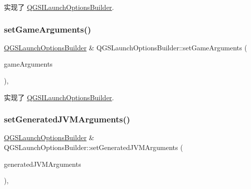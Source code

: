 实现了 \mbox{\hyperlink{class_q_g_s_i_launch_options_builder_ab3669bbcb9fc5602356cc05bc030b306}{Q\+G\+S\+I\+Launch\+Options\+Builder}}.

\mbox{\label{class_q_g_s_launch_options_builder_a6e6403b36902ac004af9ed2e9a9726c6}} 
\subsubsection{\texorpdfstring{set\+Game\+Arguments()}{setGameArguments()}}
{\footnotesize\ttfamily \mbox{\hyperlink{class_q_g_s_launch_options_builder}{Q\+G\+S\+Launch\+Options\+Builder}} \& Q\+G\+S\+Launch\+Options\+Builder\+::set\+Game\+Arguments (\begin{DoxyParamCaption}\item[{const Q\+String \&}]{game\+Arguments }\end{DoxyParamCaption})\hspace{0.3cm}{\ttfamily [override]}, {\ttfamily [virtual]}}



实现了 \mbox{\hyperlink{class_q_g_s_i_launch_options_builder_a6f428d4accdd640f6a3e58a3d69d2e6c}{Q\+G\+S\+I\+Launch\+Options\+Builder}}.

\mbox{\label{class_q_g_s_launch_options_builder_ab87202926fbd5ed59b72007963e3ea58}} 
\subsubsection{\texorpdfstring{set\+Generated\+J\+V\+M\+Arguments()}{setGeneratedJVMArguments()}}
{\footnotesize\ttfamily \mbox{\hyperlink{class_q_g_s_launch_options_builder}{Q\+G\+S\+Launch\+Options\+Builder}} \& Q\+G\+S\+Launch\+Options\+Builder\+::set\+Generated\+J\+V\+M\+Arguments (\begin{DoxyParamCaption}\item[{const bool}]{generated\+J\+V\+M\+Arguments }\end{DoxyParamCaption})\hspace{0.3cm}{\ttfamily [override]}, {\ttfamily [virtual]}}




